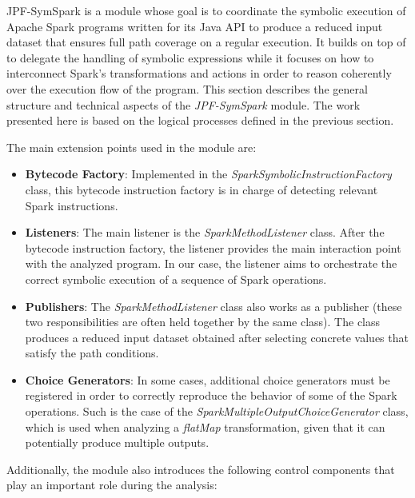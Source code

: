 \label{sec:jpf-symspark}

JPF-SymSpark is a \jpf{} module whose goal is to coordinate the symbolic execution of Apache Spark programs written for its Java API to produce a reduced input dataset that ensures full path coverage on a regular execution. It builds on top of \spf{} to delegate the handling of symbolic expressions while it focuses on how to interconnect Spark's transformations and actions in order to reason coherently over the execution flow of the program. This section describes the general structure and technical aspects of the \textit{JPF-SymSpark} module. The work presented here is based on the logical processes defined in the previous section. 

The main \jpf{} extension points used in the module are:

\begin{itemize}
	\item \textbf{Bytecode Factory}: Implemented in the \textit{SparkSymbolicInstructionFactory} class, this bytecode instruction factory is in charge of detecting relevant Spark instructions.
	\item \textbf{Listeners}: The main listener is the \textit{SparkMethodListener} class. After the bytecode instruction factory, the listener provides the main interaction point with the analyzed program. In our case, the listener aims to orchestrate the correct symbolic execution of a sequence of Spark operations.
	\item \textbf{Publishers}: The \textit{SparkMethodListener} class also works as a publisher (these two responsibilities are often held together by the same class). The class produces a reduced input dataset obtained after selecting concrete values that satisfy the path conditions.
	\item \textbf{Choice Generators}: In some cases, additional choice generators must be registered in order to correctly reproduce the behavior of some of the Spark operations. Such is the case of the \textit{SparkMultipleOutputChoiceGenerator} class, which is used when analyzing a \textit{flatMap} transformation, given that it can potentially produce multiple outputs.
\end{itemize}

Additionally, the module also introduces the following control components that play an important role during the analysis:

